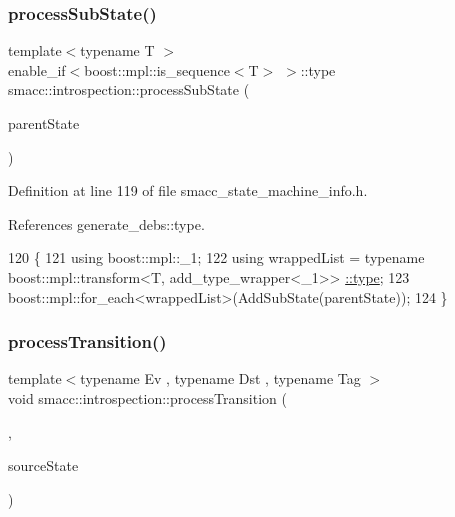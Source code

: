 \subsubsection{\texorpdfstring{process\+Sub\+State()}{processSubState()}\hspace{0.1cm}{\footnotesize\ttfamily [2/2]}}
{\footnotesize\ttfamily template$<$typename T $>$ \\
enable\+\_\+if$<$boost\+::mpl\+::is\+\_\+sequence$<$T$>$ $>$\+::type smacc\+::introspection\+::process\+Sub\+State (\begin{DoxyParamCaption}\item[{std\+::shared\+\_\+ptr$<$ \hyperlink{classsmacc_1_1introspection_1_1SmaccStateInfo}{Smacc\+State\+Info} $>$ \&}]{parent\+State }\end{DoxyParamCaption})}



Definition at line 119 of file smacc\+\_\+state\+\_\+machine\+\_\+info.\+h.



References generate\+\_\+debs\+::type.


\begin{DoxyCode}
120 \{
121     \textcolor{keyword}{using} boost::mpl::\_1;
122     \textcolor{keyword}{using} wrappedList = \textcolor{keyword}{typename} boost::mpl::transform<T, add\_type\_wrapper<\_1>>
      \hyperlink{namespacegenerate__debs_a50bc9a7ecac9584553e089a448bcde58}{::type};
123     boost::mpl::for\_each<wrappedList>(AddSubState(parentState));
124 \}
\end{DoxyCode}
\mbox{\label{namespacesmacc_1_1introspection_a91f7cda900e7002c923494db5afce63f}} 
\subsubsection{\texorpdfstring{process\+Transition()}{processTransition()}\hspace{0.1cm}{\footnotesize\ttfamily [1/4]}}
{\footnotesize\ttfamily template$<$typename Ev , typename Dst , typename Tag $>$ \\
void smacc\+::introspection\+::process\+Transition (\begin{DoxyParamCaption}\item[{\hyperlink{classsmacc_1_1Transition}{smacc\+::\+Transition}$<$ Ev, boost\+::statechart\+::deep\+\_\+history$<$ Dst $>$, Tag $>$ $\ast$}]{,  }\item[{std\+::shared\+\_\+ptr$<$ \hyperlink{classsmacc_1_1introspection_1_1SmaccStateInfo}{Smacc\+State\+Info} $>$ \&}]{source\+State }\end{DoxyParamCaption})}



